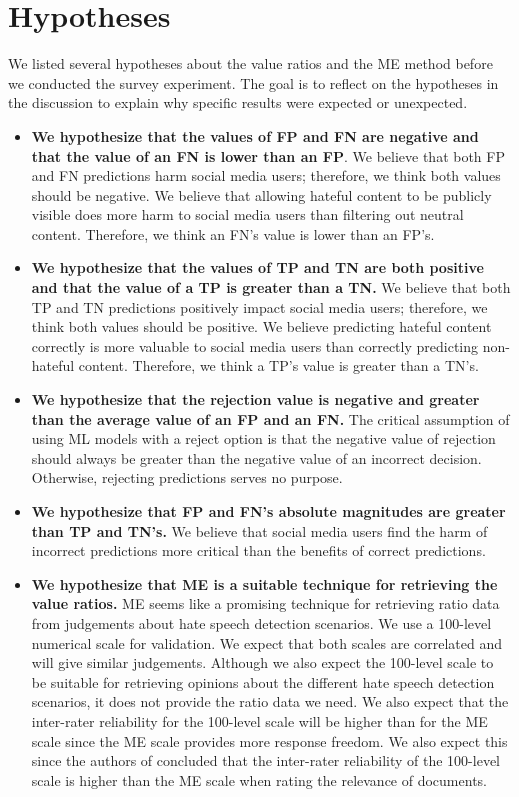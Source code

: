 \section{Hypotheses}
\label{sec:survey-hypothesis}
We listed several hypotheses about the value ratios and the ME method before we conducted the survey experiment.
%
The goal is to reflect on the hypotheses in the discussion to explain why specific results were expected or unexpected.
\begin{itemize}
    \item \textbf{We hypothesize that the values of FP and FN are negative and that the value of an FN is lower than an FP}. We believe that both FP and FN predictions harm social media users; therefore, we think both values should be negative. We believe that allowing hateful content to be publicly visible does more harm to social media users than filtering out neutral content. Therefore, we think an FN's value is lower than an FP's.
    \item \textbf{We hypothesize that the values of TP and TN are both positive and that the value of a TP is greater than a TN.} We believe that both TP and TN predictions positively impact social media users; therefore, we think both values should be positive. We believe predicting hateful content correctly is more valuable to social media users than correctly predicting non-hateful content. Therefore, we think a TP's value is greater than a TN's.
    \item \textbf{We hypothesize that the rejection value is negative and greater than the average value of an FP and an FN.} The critical assumption of using ML models with a reject option is that the negative value of rejection should always be greater than the negative value of an incorrect decision. Otherwise, rejecting predictions serves no purpose.
    \item \textbf{We hypothesize that FP and FN's absolute magnitudes are greater than TP and TN's.} We believe that social media users find the harm of incorrect predictions more critical than the benefits of correct predictions.
    \item \textbf{We hypothesize that ME is a suitable technique for retrieving the value ratios.} ME seems like a promising technique for retrieving ratio data from judgements about hate speech detection scenarios. We use a 100-level numerical scale for validation. We expect that both scales are correlated and will give similar judgements. Although we also expect the 100-level scale to be suitable for retrieving opinions about the different hate speech detection scenarios, it does not provide the ratio data we need. We also expect that the inter-rater reliability for the 100-level scale will be higher than for the ME scale since the ME scale provides more response freedom. We also expect this since the authors of \citet{roitero2018fine} concluded that the inter-rater reliability of the 100-level scale is higher than the ME scale when rating the relevance of documents.
\end{itemize}

